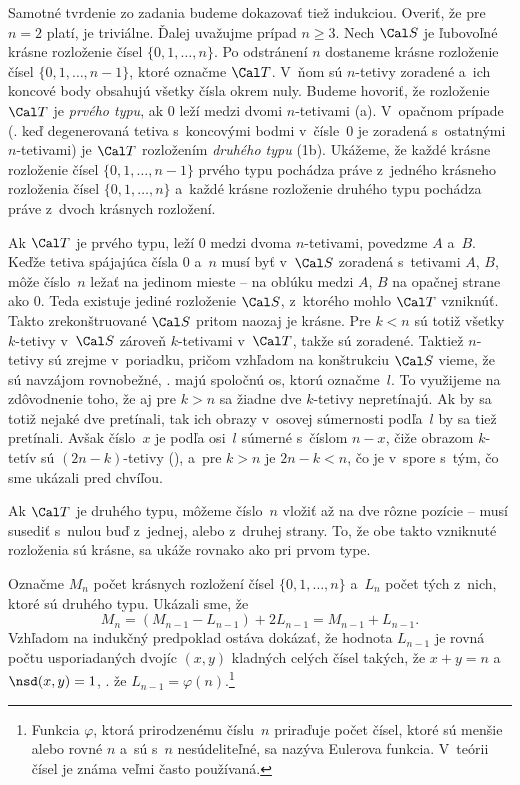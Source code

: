 {\smallskip
Samotné tvrdenie zo zadania budeme dokazovať tiež indukciou. Overiť, že pre $n=2$ platí, je triviálne. Ďalej uvažujme prípad $n\ge3$. Nech $\Cal S$ je ľubovoľné krásne rozloženie čísel $\{0,1,\dots,n\}$. Po odstránení $n$ dostaneme krásne rozloženie čísel $\{0,1,\dots,{n-1}\}$, ktoré označme $\Cal T$. V~ňom sú $n$-tetivy zoradené a~ich koncové body obsahujú všetky čísla okrem nuly. Budeme hovoriť, že rozloženie $\Cal T$ je {\it prvého typu}, ak $0$ leží medzi dvomi \hbox{$n$-tetivami} (\obr a). V~opačnom prípade (\tj. keď degenerovaná tetiva s~koncovými bodmi v~čísle~$0$ je zoradená s~ostatnými $n$-tetivami) je $\Cal T$ rozložením {\it druhého typu} (\obrr1b). Ukážeme, že každé krásne rozloženie čísel $\{0,1,\dots,n-1\}$ prvého typu pochádza práve z~jedného krásneho rozloženia čísel $\{0,1,\dots,n\}$ a~každé krásne rozloženie druhého typu pochádza práve z~dvoch krásnych rozložení.
%

Ak $\Cal T$ je prvého typu, leží $0$ medzi dvoma $n$-tetivami, povedzme $A$ a~$B$. Keďže tetiva spájajúca čísla $0$ a~$n$ musí byť v~$\Cal S$ zoradená s~tetivami $A$, $B$, môže číslo~$n$ ležať na jedinom mieste -- na oblúku medzi $A$, $B$ na opačnej strane ako $0$. Teda existuje jediné rozloženie $\Cal S$, z~ktorého mohlo $\Cal T$ vzniknúť. Takto zrekonštruované $\Cal S$ pritom naozaj je krásne. Pre $k<n$ sú totiž všetky $k$-tetivy v~$\Cal S$ zároveň $k$-tetivami v~$\Cal T$, takže sú zoradené. Taktiež $n$-tetivy sú zrejme v~poriadku, pričom vzhľadom na konštrukciu $\Cal S$ vieme, že sú navzájom rovnobežné, \tj. majú spoločnú os, ktorú označme~$l$. To využijeme na zdôvodnenie toho, že aj pre $k>n$ sa žiadne dve $k$-tetivy nepretínajú. Ak by sa totiž nejaké dve pretínali, tak ich obrazy v~osovej súmernosti podľa~$l$ by sa tiež pretínali. Avšak číslo~$x$ je podľa osi~$l$ súmerné s~číslom $n-x$, čiže obrazom $k$-tetív sú \hbox{$(2n-k)$-tetivy} (\obr), a~pre $k>n$ je $2n-k<n$, čo je v~spore s~tým, čo sme ukázali pred chvíľou.
%

Ak $\Cal T$ je druhého typu, môžeme číslo~$n$ vložiť až na dve rôzne pozície -- musí susediť s~nulou buď z~jednej, alebo z~druhej strany. To, že obe takto vzniknuté rozloženia sú krásne, sa ukáže rovnako ako pri prvom type.

Označme $M_n$ počet krásnych rozložení čísel $\{0,1,\dots,n\}$ a~$L_n$ počet tých z~nich, ktoré sú druhého typu. Ukázali sme, že $$
M_n = (M_{n-1} - L_{n-1}) + 2L_{n-1} = M_{n-1} + L_{n-1}.
$$
Vzhľadom na indukčný predpoklad ostáva dokázať, že hodnota $L_{n-1}$ je rovná počtu usporiadaných dvojíc $(x,y)$ kladných celých čísel takých, že $x+y=n$ a $\nsd(x, y) = 1$, \tj. že $L_{n-1}=\varphi(n)$.\footnote{Funkcia $\varphi$, ktorá prirodzenému číslu~$n$ priraďuje počet čísel, ktoré sú menšie alebo rovné $n$ a~sú s~$n$ nesúdeliteľné, sa nazýva Eulerova funkcia. V~teórii čísel je známa veľmi často používaná.}

}
